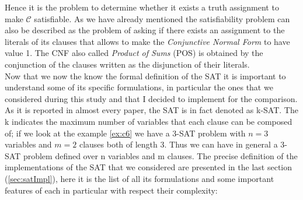 \documentclass[english]{article}
\begin{document}
			Hence it is the problem to determine whether it exists a truth assignment to make $\mathcal{C}$ satisfiable. As we have already mentioned the satisfiability problem can also be described as the problem of asking if there exists an assignment to the literals of its clauses that allows to make the \emph{Conjunctive Normal Form} to have value 1. The CNF also called \emph{Product of Sums} (POS) is obtained by the conjunction of the clauses written as the disjunction of their literals. \\
			
			Now that we now the know the formal definition of the SAT it is important to understand some of its specific formulations, in particular the ones that we considered during this study and that I decided to implement for the comparison. As it is reported in almost every paper, the SAT is in fact denoted as k-SAT. The k indicates the maximum number of variables that each clause can be composed of; if we look at the example \ref{ex:c6} we have a 3-SAT problem with $n = 3$ variables and $m=2$ clauses both of length 3. Thus we can have in general a 3-SAT problem defined over n variables and m clauses. The precise definition of the implementations of the SAT that we considered are presented in the last section (\ref{sec:satImpl}), here it is the list of all its formulations and some important features of each in particular with respect their complexity:
			
\end{document}

